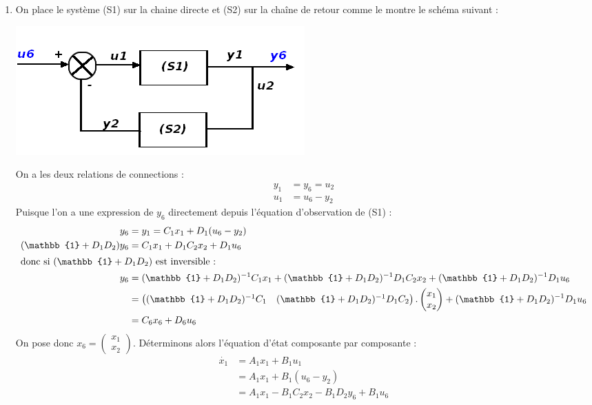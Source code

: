 \documentclass[../main.tex]{subfiles}
\begin{document}
\begin{enumerate}
\item On place le système (S1) sur la chaine directe et (S2) sur la chaîne de retour comme le montre le schéma suivant :\\
\begin{center}
\includegraphics[scale=0.5]{TD5-4.png}
\end{center}
On a les deux relations de connections :\\
\begin{align*}
y_1 &= y_6 = u_2\\
u_1 &= u_6 - y_2
\end{align*}
Puisque l'on a une expression de $y_6$ directement depuis l'équation d'observation de (S1) :
\begin{align*}
y_6 &= y_1 = C_1 x_1 + D_1 (u_6 -y_2)\\
(\mathbb{1}+ D_1D_2)y_6 &= C_1x_1 + D_1C_2x_2 + D_1 u_6\\
\intertext{donc si $(\mathbb{1}+ D_1D_2)$ est inversible :}
y_6 &= (\mathbb{1}+ D_1D_2)^{-1} C_1 x_1 + (\mathbb{1}+ D_1D_2)^{-1}D_1C_2 x_2 + (\mathbb{1}+ D_1D_2)^{-1}D_1 u_6\\
&= \begin{pmatrix}
(\mathbb{1}+ D_1D_2)^{-1}C_1 & (\mathbb{1}+ D_1D_2)^{-1}D_1C_2\end{pmatrix}. \begin{pmatrix}
x_1\\x_2\end{pmatrix} + (\mathbb{1}+ D_1D_2)^{-1}D_1 u_6\\
&= C_6 x_6 + D_6 u_6
\end{align*}
On pose donc $x_6 = \begin{pmatrix}x_1\\x_2\end{pmatrix}$. Déterminons alors l'équation d'état composante par composante :
\begin{align*}
\dot{x_1} &= A_1 x_1 + B_1 u_1\\
&= A_1 x_1 +B_1(u_6 -y_2)\\
&= A_1 x_1  - B_1 C_2x_2 - B_1 D_2 y_6 + B_1 u_6\\

\end{align*}
\end{enumerate}
\end{document}

